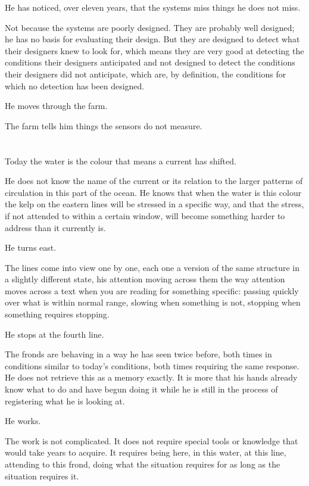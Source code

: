He has noticed, over eleven years, that the systems
miss things he does not miss.

Not because the systems are poorly designed. They
are probably well designed; he has no basis for
evaluating their design. But they are designed to
detect what their designers knew to look for, which
means they are very good at detecting the conditions
their designers anticipated and not designed to detect
the conditions their designers did not anticipate,
which are, by definition, the conditions for which
no detection has been designed.

He moves through the farm.

The farm tells him things the sensors do not measure.

\section{}

Today the water is the colour that means a current
has shifted.

He does not know the name of the current or its
relation to the larger patterns of circulation in
this part of the ocean. He knows that when the
water is this colour the kelp on the eastern lines
will be stressed in a specific way, and that the
stress, if not attended to within a certain window,
will become something harder to address than it
currently is.

He turns east.

The lines come into view one by one, each one a
version of the same structure in a slightly different
state, his attention moving across them the way
attention moves across a text when you are reading
for something specific: passing quickly over what
is within normal range, slowing when something is
not, stopping when something requires stopping.

He stops at the fourth line.

The fronds are behaving in a way he has seen twice
before, both times in conditions similar to today's
conditions, both times requiring the same response.
He does not retrieve this as a memory exactly. It
is more that his hands already know what to do and
have begun doing it while he is still in the process
of registering what he is looking at.

He works.

The work is not complicated. It does not require
special tools or knowledge that would take years
to acquire. It requires being here, in this water,
at this line, attending to this frond, doing what
the situation requires for as long as the situation
requires it.

